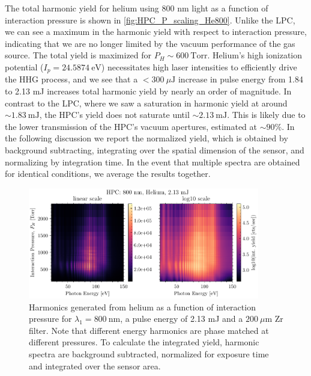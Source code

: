 The total harmonic yield for helium using 800 nm light as a function of interaction pressure is shown in \cref{fig:HPC_P_scaling_He800}. Unlike the LPC, we can see a maximum in the harmonic yield with respect to interaction pressure, indicating that we are no longer limited by the vacuum performance of the gas source. The total yield is maximized for $P_H \sim 600 \ \textrm{Torr}$. Helium's high ionization potential ($I_p = 24.5874 \ \textrm{eV}$) necessitates high laser intensities to efficiently drive the HHG process, and we see that a $<300 \ \mu \textrm{J}$ increase in pulse energy from 1.84 to 2.13 mJ increases total harmonic yield by nearly an order of magnitude. In contrast to the LPC, where we saw a saturation in harmonic yield at around $\sim 1.83 \ \textrm{mJ}$, the HPC's yield does not saturate until $\sim 2.13 \ \textrm{mJ}$. This is likely due to the lower transmission of the HPC's vacuum apertures, estimated at $\sim 90 \%$. In the following discussion we report the normalized yield, which is obtained by background subtracting, integrating over the spatial dimension of the sensor, and normalizing by integration time. In the event that multiple spectra are obtained for identical conditions, we average the results together.

\begin{figure}
	\centering
	\includegraphics[width=0.9\textwidth]{figures/chap3/HPC_800nm_He_spectrogram.pdf}
	\caption{Harmonics generated from helium as a function of interaction pressure for $\lambda_1 = 800 \ \textrm{nm}$, a pulse energy of 2.13 mJ and a $200 \ \mu \textrm{m}$ Zr filter. Note that different energy harmonics are phase matched at different pressures. To calculate the integrated yield, harmonic spectra are background subtracted, normalized for exposure time and integrated over the sensor area.}
	\label{fig:HPC_800nm_He_spectrogram}
\end{figure}

